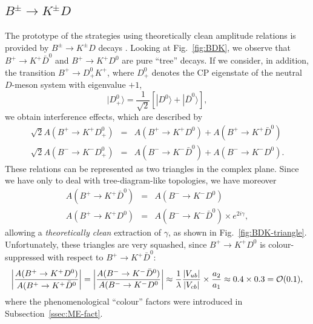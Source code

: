 \documentclass[11pt]{cernrep}
\begin{document}
\subsection{$B^\pm\to K^\pm D$}
\unboldmath
%
%
%
The prototype of the strategies using theoretically clean amplitude 
relations is provided by $B^\pm \to K^\pm D$ decays \cite{gw}. Looking at 
Fig.~\ref{fig:BDK}, we observe that $B^+\to K^+\bar D^0$ and $B^+\to K^+D^0$ 
are pure ``tree'' decays. If we consider, in addition, the transition 
$B^+\to D^0_+K^+$, where $D^0_+$ denotes the CP 
eigenstate of the neutral $D$-meson system with eigenvalue $+1$,
\begin{equation}\label{ED85}
|D^0_+\rangle=\frac{1}{\sqrt{2}}\left[|D^0\rangle+
|\bar D^0\rangle\right],
\end{equation}
we obtain interference effects, which are described by
\begin{eqnarray}
\sqrt{2}A(B^+\to K^+D^0_+)&=&A(B^+\to K^+D^0)+
A(B^+\to K^+\bar D^0)\\
\sqrt{2}A(B^-\to K^-D^0_+)&=&A(B^-\to K^-\bar D^0)+
A(B^-\to K^-D^0).
\end{eqnarray}
These relations can be represented as two triangles in 
the complex plane. Since we have only to deal with tree-diagram-like 
topologies, we have moreover
\begin{eqnarray}
A(B^+\to K^+\bar D^0)&=&A(B^-\to K^-D^0)\\
A(B^+\to K^+D^0)&=&A(B^-\to K^-\bar D^0)\times e^{2i\gamma},
\end{eqnarray}
allowing a {\it theoretically clean} extraction of $\gamma$, as shown 
in Fig.~\ref{fig:BDK-triangle}. Unfortunately, these triangles are 
very squashed, since $B^+\to K^+D^0$ is colour-suppressed 
with respect to $B^+\to K^+\bar D^0$:
\begin{equation}\label{BDK-suppr}
\left|\frac{A(B^+\to K^+D^0)}{A(B^+\to K^+\bar D^0}\right|=
\left|\frac{A(B^-\to K^-\bar D^0)}{A(B^-\to K^-D^0}\right|\approx
\frac{1}{\lambda}\frac{|V_{ub}|}{|V_{cb}|}\times\frac{a_2}{a_1}
\approx 0.4\times0.3={\cal O}(0.1),
\end{equation}
where the phenomenological ``colour'' factors were introduced in
Subsection~\ref{ssec:ME-fact}. 
\end{document}

